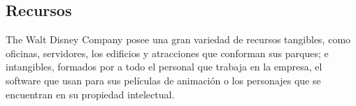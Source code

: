 \subsection{Recursos}
The Walt Disney Company posee una gran variedad de recursos tangibles, como oficinas, servidores, los edificios y atracciones que conforman sus parques; e intangibles, formados por a todo el personal que trabaja en la empresa, el software que usan para sus películas de animación o los personajes que se encuentran en su propiedad intelectual.